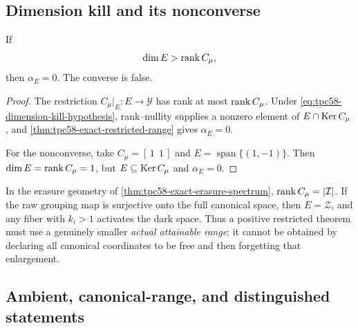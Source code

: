 \subsection{Dimension kill and its nonconverse}

\begin{proposition}
\label{prop:tpc58-dimension-kill}
If
\begin{equation}
 \dim E>\operatorname{rank} C_\mu,
 \label{eq:tpc58-dimension-kill-hypothesis}
\end{equation}
then \(\alpha_E=0\).  The converse is false.
\end{proposition}

\begin{proof}
The restriction \(C_\mu|_E:E\to\mathcal Y\) has rank at most
\(\operatorname{rank} C_\mu\).  Under
\eqref{eq:tpc58-dimension-kill-hypothesis}, rank--nullity supplies a nonzero
element of \(E\cap\operatorname{Ker} C_\mu\), and
\cref{thm:tpc58-exact-restricted-range} gives \(\alpha_E=0\).

For the nonconverse, take \(C_\mu=[\,1\ \ 1\,]\) and
\(E=\operatorname{span}\{(1,-1)\}\).  Then
\(\dim E=\operatorname{rank} C_\mu=1\), but \(E\subseteq\operatorname{Ker} C_\mu\) and
\(\alpha_E=0\).
\end{proof}

In the erasure geometry of
\cref{thm:tpc58-exact-erasure-spectrum},
\(\operatorname{rank} C_\mu=|\mathcal I|\).  If the raw grouping map is surjective onto
the full canonical space, then \(E=\mathcal Z\), and any fiber with
\(k_i>1\) activates the dark space.  Thus a positive restricted theorem
must use a genuinely smaller \emph{actual attainable range}; it cannot be
obtained by declaring all canonical coordinates to be free and then
forgetting that enlargement.

\subsection{Ambient, canonical-range, and distinguished statements}

